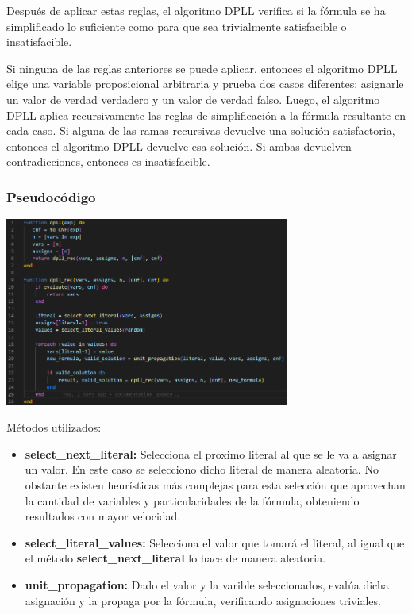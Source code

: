 \documentclass{article}
\begin{document}
        Después de aplicar estas reglas, el algoritmo DPLL verifica si la fórmula se ha simplificado lo suficiente como para que sea 
        trivialmente satisfacible o insatisfacible.  

        Si ninguna de las reglas anteriores se puede aplicar, entonces el algoritmo DPLL elige una variable proposicional 
        arbitraria y prueba dos casos diferentes: asignarle un valor de verdad verdadero y un valor de verdad falso.
        Luego, el algoritmo DPLL aplica recursivamente las reglas de simplificación a la fórmula resultante en cada caso. 
        Si alguna de las ramas recursivas devuelve una solución satisfactoria, entonces el algoritmo DPLL devuelve esa solución.
        Si ambas devuelven contradicciones, entonces es insatisfacible.

            \subsubsection*{Pseudocódigo}
                \includegraphics[width = 0.7\textwidth]{resources/code2.png}

                Métodos utilizados:
                \begin{itemize}
                    \item \textbf{select\_next\_literal:} Selecciona el proximo literal al que se le va a asignar un valor. En este caso se selecciono
                    dicho literal de manera aleatoria. No obstante existen heurísticas más complejas para esta selección que aprovechan la cantidad de 
                    variables y particularidades de la fórmula, obteniendo resultados con mayor velocidad.
                    \item \textbf{select\_literal\_values:} Selecciona el valor que tomará el literal, al igual que el método
                     \textbf{select\_next\_literal} lo hace de manera aleatoria.
                    \item \textbf{unit\_propagation:} Dado el valor y la varible seleccionados, evalúa dicha asignación y la propaga por la fórmula, 
                    verificando asignaciones triviales.
                \end{itemize}
\end{document}
